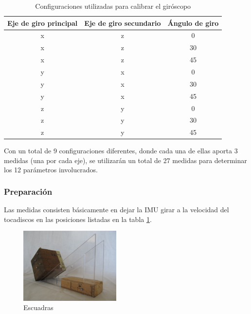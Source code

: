 \documentclass[spanish,12pt,a4paper,titlepage]{report}
\begin{document}
\begin{table}[H]
\centering
\begin{small}
\begin{tabular}{|c|c|c|}
\hline
  {\cellcolor[gray]{0.85} \centering \textbf{Eje de giro principal}}
& {\cellcolor[gray]{0.85} \centering \textbf{Eje de giro secundario}}
& {\cellcolor[gray]{0.85} \centering \textbf{Ángulo de giro}} \\ \hline  \hline
x & z & 0 \\ \hline
x & z & 30 \\ \hline
x & z & 45 \\ \hline
y & x & 0 \\ \hline
y & x & 30 \\ \hline
y & x & 45 \\ \hline
z & y & 0 \\ \hline
z & y & 30 \\ \hline
z & y & 45 \\ \hline
\end{tabular}
\caption{Configuraciones utilizadas para calibrar el giróscopo}
\label{tab:gyros}
\end{small}
\end{table} 

Con un total de 9 configuraciones diferentes, donde cada una de ellas aporta 3 medidas (una por cada eje), se utilizarán un total de 27 medidas para determinar los 12 parámetros involucrados.

\subsubsection*{Preparación}

Las medidas consisten básicamente en dejar la IMU girar a la velocidad del tocadiscos en las posiciones listadas en la tabla \ref{tab:gyros}. 

\begin{figure}
  \vspace{-20pt}
  \begin{center}
    \includegraphics[width=0.45\textwidth]
    	{./pics/escuadra.jpg}
  \end{center}
  \vspace{-20pt}
  \caption{Escuadras}
  \label{fig:escuadras}
  \vspace{-10pt}
\end{figure}
\end{document}
